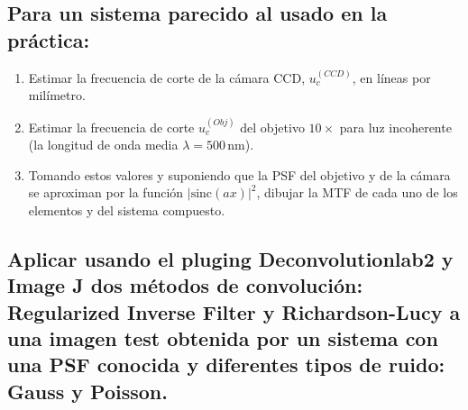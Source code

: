 \documentclass{./packages/optica-article}
\newcommand{\sinc}{\textrm{sinc}}
\begin{document}
\subsection{Para un sistema parecido al usado en la práctica:}
	\begin{enumerate}
		\item Estimar la frecuencia de corte de la cámara CCD, $u_{c}^{(CCD)}$, en líneas por milímetro.
		\item Estimar la frecuencia de corte $u_{c}^{(Obj)}$ del objetivo $10\times$ para luz incoherente (la longitud de onda media $\lambda=500\,\unit{\nano\metre}$).
		\item Tomando estos valores y suponiendo que la PSF del objetivo y de la cámara se aproximan por la función $|\sinc(ax)|^2$, dibujar la MTF de cada uno de los elementos y del sistema compuesto.
	\end{enumerate}


\subsection{Aplicar usando el pluging Deconvolutionlab2 y Image J dos métodos de convolución: Regularized Inverse Filter y Richardson-Lucy a una imagen test obtenida por un sistema con una PSF conocida y diferentes tipos de ruido: Gauss y Poisson.}
\end{document}
